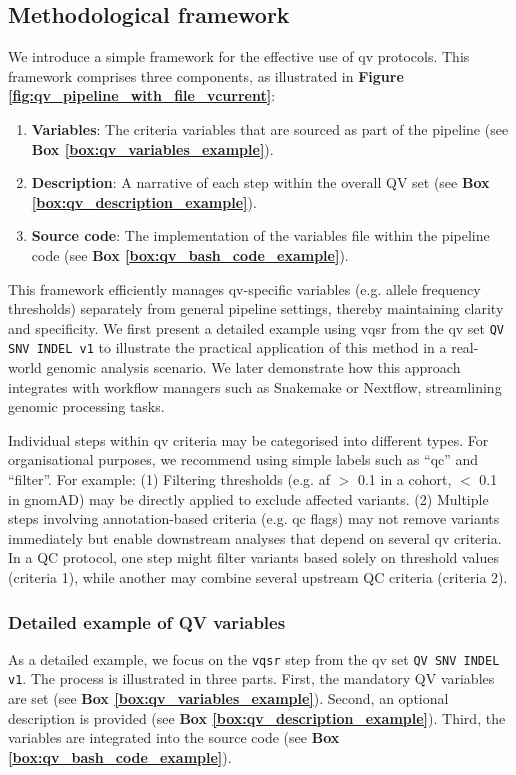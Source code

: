 \subsection{Methodological framework} \label{sec:framework}
We introduce a simple framework for the effective use of \ac{qv}  protocols. This framework comprises three components, as illustrated in \textbf{Figure \ref{fig:qv_pipeline_with_file_vcurrent}}:
\begin{enumerate}
    \item \textbf{Variables}: The criteria variables that are sourced as part of the pipeline (see \textbf{Box \ref{box:qv_variables_example}}).
    \item \textbf{Description}: A narrative of each step within the overall QV set (see \textbf{Box \ref{box:qv_description_example}}).
    \item \textbf{Source code}: The implementation of the variables file within the pipeline code (see \textbf{Box \ref{box:qv_bash_code_example}}).
\end{enumerate}

This framework efficiently manages \ac{qv}-specific variables (e.g. allele frequency thresholds) separately from general pipeline settings, thereby maintaining clarity and specificity. We first present a detailed example using \ac{vqsr} from the \ac{qv} set \colorbox{colorSUNSET2!60}{\texttt{QV SNV INDEL v1}} to illustrate the practical application of this method in a real-world genomic analysis scenario. We later demonstrate how this approach integrates with workflow managers such as Snakemake or Nextflow, streamlining genomic processing tasks.

Individual steps within \ac{qv} criteria may be categorised into different types. For organisational purposes, we recommend using simple labels such as ``\ac{qc}'' and ``filter''. For example: (1) Filtering thresholds (e.g. \ac{af} $>$ 0.1 in a cohort, $<$ 0.1 in gnomAD) may be directly applied to exclude affected variants. (2) Multiple steps involving annotation-based criteria (e.g. \ac{qc} flags) may not remove variants immediately but enable downstream analyses that depend on several \ac{qv} criteria.
In a QC protocol, one step might filter variants based solely on threshold values (criteria 1), while another may combine several upstream QC criteria (criteria 2).

\subsubsection{Detailed example of QV variables}\label{sec:protocol_variables_example}
As a detailed example, we focus on the \colorbox{kispiblue!30}{\texttt{vqsr}} step from the \ac{qv} set \colorbox{colorSUNSET2!60}{\texttt{QV SNV INDEL v1}}. The process is illustrated in three parts.
First, the mandatory QV variables are set (see \textbf{Box \ref{box:qv_variables_example}}).
Second, an optional description is provided (see \textbf{Box \ref{box:qv_description_example}}).
Third, the variables are integrated into the source code (see \textbf{Box \ref{box:qv_bash_code_example}}).

